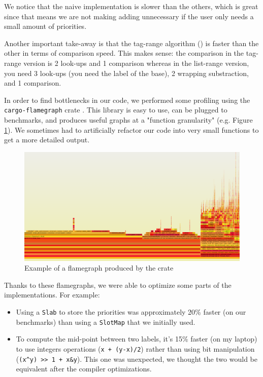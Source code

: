 \documentclass[12pt]{article}
\begin{document}
We notice that the naive implementation is slower than the others, which is great since that means we are not making adding unnecessary if the user only needs a small amount of priorities.

Another important take-away is that the tag-range algorithm (\cite{10.5555/647912.740822}) is faster than the other in terms of comparison speed. This makes sense: the comparison in the tag-range version is 2 look-ups and 1 comparison whereas in the list-range version, you need 3 look-ups (you need the label of the base), 2 wrapping substraction, and 1 comparison.

In order to find bottlenecks in our code, we performed some profiling using the \texttt{cargo-flamegraph} crate \cite{flamegraph-crate}. This library is easy to use, can be plugged to benchmarks, and produces useful graphs at a "function granularity" (e.g. Figure \ref{graph:flame}). We sometimes had to artificially refactor our code into very small functions to get a more detailed output.

\begin{figure}[h!]
    \includegraphics[width=450px, keepaspectratio]{./flamegraph.png}
    \caption{Example of a flamegraph produced by the crate}
    \label{graph:flame}
\end{figure}

Thanks to these flamegraphs, we were able to optimize some parts of the implementations. For example:
\begin{itemize}
    \item Using a \texttt{Slab} \cite{slab-crate} to store the priorities was approximately 20\% faster (on our benchmarks) than using a \texttt{SlotMap} \cite{slotmap-crate} that we initially used.
    \item To compute the mid-point between two labels, it's 15\% faster (on my laptop) to use integers operations (\texttt{x + (y-x)/2}) rather than using bit manipulation (\texttt{(x\textasciicircum y) >> 1 + x\&y}). This one was unexpected, we thought the two would be equivalent after the compiler optimizations.
\end{itemize}
\end{document}
